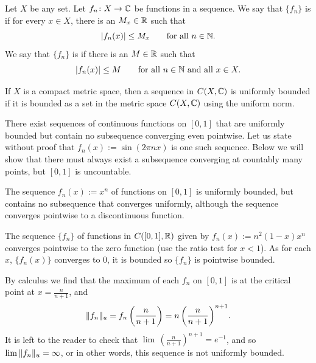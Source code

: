 \begin{defn}
Let $X$ be any set.
Let $f_n \colon X \to {\mathbb{C}}$ be functions in a sequence.  We say that
$\{ f_n \}$
is \emph{} if for every $x \in X$, there is an $M_x \in {\mathbb{R}}$
such that
\begin{equation*}
\lvert {f_n(x)} \rvert \leq M_x \qquad \text{for all } n \in {\mathbb{N}} .
\end{equation*}
We say that
$\{ f_n \}$
is \emph{} if there is an $M \in {\mathbb{R}}$
such that
\begin{equation*}
\lvert {f_n(x)} \rvert \leq M \qquad \text{for all } n \in {\mathbb{N}} \text{ and all } x \in X.
\end{equation*}
\end{defn}

If $X$ is a compact metric space, then a sequence in $C(X,{\mathbb{C}})$
is uniformly bounded if it is bounded as a set in the metric space
$C(X,{\mathbb{C}})$ using the uniform norm.

\begin{example}
There exist sequences of 
continuous functions
on $[0,1]$ that are uniformly bounded but contain no subsequence converging
even pointwise.
Let us state without proof that $f_n(x) := \sin (2\pi n x)$ is one
such sequence.
Below we will show that there must always exist
a subsequence converging at countably
many points, but $[0,1]$ is uncountable.
\end{example}

\begin{example}
The sequence $f_n(x) := x^n$ of functions on $[0,1]$
is uniformly bounded, but contains no subsequence that converges
uniformly,
although the sequence converges pointwise to a discontinuous function.
\end{example}

\begin{example}
The sequence $\{ f_n \}$ of functions in $C([0,1],{\mathbb{R}})$ given by $f_n(x) := n^2(1-x)x^n$
converges pointwise to the zero function (use the ratio test for
$x < 1$).  As for each $x$, $\{f_n(x)\}$ converges to 0, it is bounded
so $\{ f_n \}$ is pointwise bounded.

By calculus we find that the maximum of each $f_n$ on
$[0,1]$ is at the critical point at $x=\frac{n}{n+1}$, and
\begin{equation*}
\lVert {f_n} \rVert_u
=
f_n\left(\frac{n}{n+1}\right)
= n \, {\left(\frac{n}{n+1}\right)}^{n+1} .
\end{equation*}
It is left to the reader to check that
$\lim\, {\left(\frac{n}{n+1}\right)}^{n+1} = e^{-1}$, and so
$\lim\, \lVert {f_n} \rVert_u = \infty$, or in other words,
this sequence is not uniformly bounded.
\end{example}


